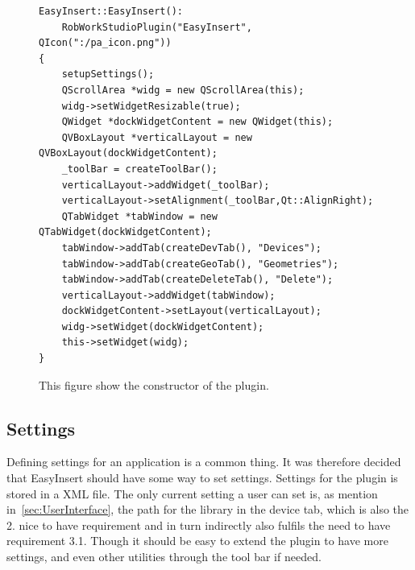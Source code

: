 \begin{figure}[h] %
\centering
\lstset{language=C++} 
\begin{lstlisting}[frame=single]  
EasyInsert::EasyInsert():
    RobWorkStudioPlugin("EasyInsert", QIcon(":/pa_icon.png"))
{
    setupSettings();
    QScrollArea *widg = new QScrollArea(this);
	widg->setWidgetResizable(true);
	QWidget *dockWidgetContent = new QWidget(this);
	QVBoxLayout *verticalLayout = new QVBoxLayout(dockWidgetContent);
    _toolBar = createToolBar();
    verticalLayout->addWidget(_toolBar);
    verticalLayout->setAlignment(_toolBar,Qt::AlignRight);
    QTabWidget *tabWindow = new QTabWidget(dockWidgetContent);
    tabWindow->addTab(createDevTab(), "Devices");
    tabWindow->addTab(createGeoTab(), "Geometries");
    tabWindow->addTab(createDeleteTab(), "Delete");
    verticalLayout->addWidget(tabWindow);
    dockWidgetContent->setLayout(verticalLayout);
    widg->setWidget(dockWidgetContent);
	this->setWidget(widg);
}
\end{lstlisting}
\caption{This figure show the constructor of the plugin.}
\label{fig:eiClass} 	
\end{figure}

\subsection{Settings}
\label{sec:Settings}
Defining settings for an application is a common thing. It was therefore decided that EasyInsert should have some way to set settings. Settings for the plugin is stored in a XML file. The only current setting a user can set is, as mention in~\ref{sec:UserInterface}, the path for the library in the device tab, which is also the 2. nice to have requirement and in turn indirectly also fulfils the need to have requirement 3.1. Though it should be easy to extend the plugin to have more settings, and even other utilities through the tool bar if needed.\\

